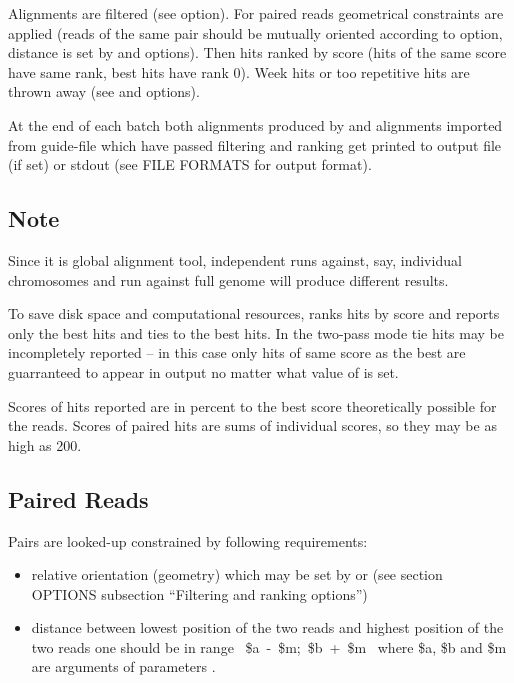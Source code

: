 \documentclass[english]{article}
\begin{document}
    Alignments are filtered (see  option). For paired reads geometrical
    constraints are applied (reads of the same pair should be mutually 
    oriented according to  option, distance is set by  and 
    options). Then hits ranked by score (hits of the same score have same
    rank, best hits have rank 0). Week hits or too repetitive hits are 
    thrown away (see  and  options).

    At the end of each batch both alignments produced by  and
    alignments imported from guide-file which have passed filtering and
    ranking get printed to output file (if set) or stdout (see 
	FILE FORMATS for output format).

\subsection{Note}

    Since it is global alignment tool, independent runs against, say,
    individual chromosomes and run against full genome will produce different 
    results.

    To save disk space and computational resources,  ranks hits by
    score and reports only the best hits and ties to the best hits. 
    In the two-pass mode tie hits may be incompletely reported -- in this 
    case only hits of same score as the best are guarranteed to appear in 
    output no matter what value of  is set.

    Scores of hits reported are in percent to the best score theoretically
    possible for the reads. Scores of paired hits are sums of individual
    scores, so they may be as high as 200.
    
\subsection{Paired Reads}

	Pairs are looked-up constrained by following requirements: 
	\begin{itemize}
	\item relative orientation (geometry) which may be set by  
	   or  (see section OPTIONS subsection ``Filtering and ranking options'')
    \item distance between lowest position of the two reads and highest
       position of the two reads one should be in range \Lbr~\$a~-~\$m;~\$b~+~\$m~\Rbr 
       where \$a, \$b and \$m are arguments of parameters  
	   .
	\end{itemize}
\end{document}
